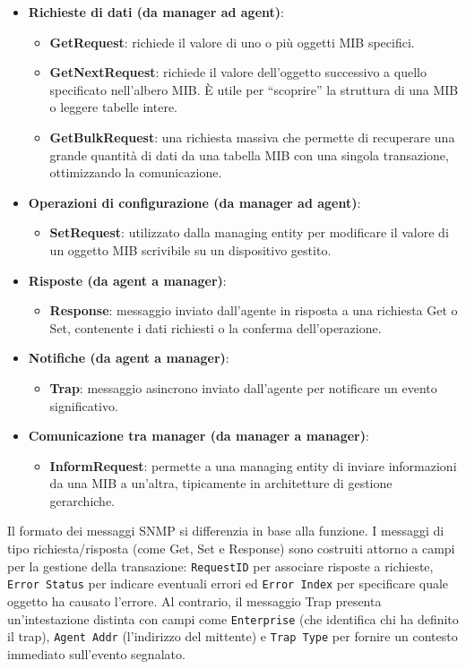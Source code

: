 \begin{itemize}
\item \textbf{Richieste di dati (da manager ad agent)}:
\begin{itemize}
\item \textbf{GetRequest}: richiede il valore di uno o più oggetti MIB
specifici.
\item \textbf{GetNextRequest}: richiede il valore dell'oggetto successivo a
quello specificato nell'albero MIB. È utile per ``scoprire'' la struttura di
una MIB o leggere tabelle intere.
\item \textbf{GetBulkRequest}: una richiesta massiva che permette di recuperare
una grande quantità di dati da una tabella MIB con una singola transazione,
ottimizzando la comunicazione.
\end{itemize}
\item \textbf{Operazioni di configurazione (da manager ad agent)}:
\begin{itemize}
\item \textbf{SetRequest}: utilizzato dalla managing entity per modificare il
valore di un oggetto MIB scrivibile su un dispositivo gestito.
\end{itemize}
\item \textbf{Risposte (da agent a manager)}:
\begin{itemize}
\item \textbf{Response}: messaggio inviato dall'agente in risposta a una
richiesta Get o Set, contenente i dati richiesti o la conferma
dell'operazione.
\end{itemize}
\item \textbf{Notifiche (da agent a manager)}:
\begin{itemize}
\item \textbf{Trap}: messaggio asincrono inviato dall'agente per notificare un
evento significativo.
\end{itemize}
\item \textbf{Comunicazione tra manager (da manager a manager)}:
\begin{itemize}
\item \textbf{InformRequest}: permette a una managing entity di inviare
informazioni da una MIB a un'altra, tipicamente in architetture di gestione
gerarchiche.
\end{itemize}
\end{itemize}

Il formato dei messaggi SNMP si differenzia in base alla funzione. I messaggi
di tipo richiesta/risposta (come Get, Set e Response) sono costruiti attorno a
campi per la gestione della transazione: \texttt{RequestID} per associare
risposte a richieste, \texttt{Error Status} per indicare eventuali errori ed
\texttt{Error Index} per specificare quale oggetto ha causato l'errore.
Al contrario, il messaggio Trap presenta un'intestazione distinta con campi come
\texttt{Enterprise} (che identifica chi ha definito il trap), \texttt{Agent Addr}
(l'indirizzo del mittente) e \texttt{Trap Type} per fornire un contesto immediato
sull'evento segnalato.

